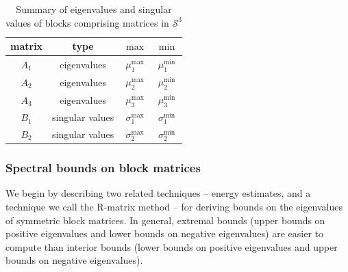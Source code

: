 \documentclass{article}
\newcommand{\st}{\mathcal{S}^3}
\begin{document}
\begin{table}
 \begin{center}
 \begin{tabular}{|c|c|c|c|}
 \hline
 matrix & type  & $\max$ & $\min$ \\
 \hline \hline
 $A_1$ & eigenvalues  &   $\mu_1^{\max}$ & $\mu_1^{\min}$  \\ \hline
  $A_2$ & eigenvalues & $\mu_2^{\max}$ & $\mu_2^{\min}$  \\ \hline
 $A_3$ & eigenvalues & $\mu_3^{\max}$ & $\mu_3^{\min}$  \\ \hline
 $B_1$ & singular values & $\sigma_{1}^{\max}$ &  $\sigma_{1}^{\min}$ \\ \hline
 $B_2$ & singular values & $\sigma_{2}^{\max}$ &  $\sigma_{2}^{\min}$ \\ \hline
 \end{tabular}
 \end{center}
 \caption{Summary of eigenvalues and singular values of blocks comprising matrices in $\st$}
 \label{tab:notation}
\end{table}

\subsubsection{Spectral bounds on block matrices} We begin by describing two related techniques -- energy estimates, and a technique we call the R-matrix method \cite[Chapter 1.4]{BradleyThesis2022} -- for deriving bounds on the eigenvalues of symmetric block matrices. In general, extremal bounds (upper bounds on positive eigenvalues and lower bounds on negative eigenvalues) are easier to compute than interior bounds (lower bounds on positive eigenvalues and upper bounds on negative eigenvalues).
\end{document}
